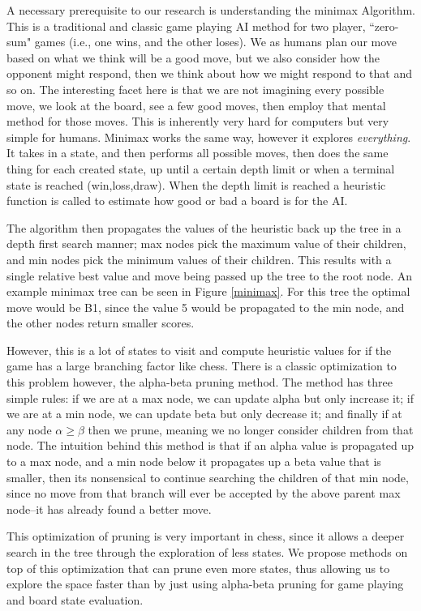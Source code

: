 \documentclass[letterpaper]{article}
\begin{document}
A necessary prerequisite to our research is understanding the minimax Algorithm. This is a traditional and classic game playing AI method for two player, ``zero-sum" games (i.e., one wins, and the other loses). We as humans plan our move based on what we think will be a good move, but we also consider how the opponent might respond, then we think about how we might respond to that and so on. The interesting facet here is that we are not imagining every possible move, we look at the board, see a few good moves, then employ that mental method for those moves. This is inherently very hard for computers but very simple for humans.  Minimax works the same way, however it explores \textit{everything}. It takes in a state, and then performs all possible moves, then does the same thing for each created state, up until a certain depth limit or when a terminal state is reached (win,loss,draw). When the depth limit is reached a heuristic function is called to estimate how good or bad a board is for the AI.

The algorithm then propagates the values of the heuristic back up the tree in a depth first search manner; max nodes pick the maximum value of their children, and min nodes pick the minimum values of their children. This results with a single relative best value and move being passed up the tree to the root node. An example minimax tree can be seen in Figure \ref{minimax}. For this tree the optimal move would be B1, since the value 5 would be propagated to the min node, and the other nodes return smaller scores.

However, this is a lot of states to visit and compute heuristic values for if the game has a large branching factor like chess. There is a classic optimization to this problem however, the alpha-beta pruning method. The method has three simple rules: if we are at a max node, we can update alpha but only increase it; if we are at a min node, we can update beta but only decrease it; and finally if at any node $\alpha \geq \beta$ then we prune, meaning we no longer consider children from that node. The intuition behind this method is that if an alpha value is propagated up to a max node, and a min node below it propagates up a beta value that is smaller, then its nonsensical to continue searching the children of that min node, since no move from that branch will ever be accepted by the above parent max node--it has already found a better move. 

This optimization of pruning is very important in chess, since it allows a deeper search in the tree through the exploration of less states. We propose methods on top of this optimization that can prune even more states, thus allowing us to explore the space faster than by just using alpha-beta pruning for game playing and board state evaluation. 
\end{document}
